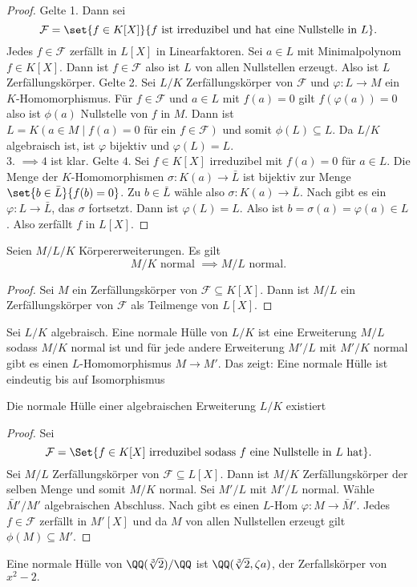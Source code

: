 \begin{proof}
    Gelte 1. Dann sei \[\mathcal F=\set{f\in K[X]}{ f\text{ ist irreduzibel und hat eine Nullstelle in \(L\)}}.\]
    Jedes \(f\in \mathcal F\) zerfällt in \(L[X]\) in Linearfaktoren.
    Sei \(a\in L\) mit Minimalpolynom \(f\in K[X]\). Dann ist \(f\in\mathcal F\) also ist \(L\) von allen Nullstellen erzeugt. Also ist \(L\) Zerfällungskörper.
    Gelte 2. Sei \(L/K\) Zerfällungskörper von \(\mathcal F\) und \(\varphi\colon L\to M\) ein \(K\)-Homomorphismus. Für \(f\in \mathcal F\) und \(a\in L\) mit \(f(a)=0\) gilt \(f(\varphi(a))=0\) also ist \(\phi(a)\) Nullstelle von \(f\) in \(M\).
    Dann ist \(L=K(a\in M\mid f(a)=0 \text{ für ein } f\in\mathcal F)\) und somit \(\phi(L)\subseteq L\). Da \(L/K\) algebraisch ist, ist \(\varphi\) bijektiv und \(\varphi(L)=L.\)\\
    3. \(\implies 4\) ist klar. Gelte \(4.\) Sei \(f\in K[X]\) irreduzibel mit \(f(a)=0\) für \(a\in L\).
    Die Menge der \(K\)-Homomorphismen \(\sigma\colon K(a)\to \bar L\) ist bijektiv zur Menge \(\set{b\in\bar L}{ f(b)=0}\). Zu \(b\in \bar L\) wähle also \(\sigma\colon K(a)\to \bar L\).
    Nach  gibt es ein \(\varphi\colon L\to \bar L\), das \(\sigma\) fortsetzt. Dann ist \(\varphi(L)=L\). Also ist \(b=\sigma(a)=\varphi(a)\in L\). Also zerfällt \(f\) in \(L[X]\).
\end{proof}
\begin{Lemma}
    Seien \(M/L/K\) Körpererweiterungen. Es gilt \[M/K \text{ normal }\implies M/L \text{ normal.}\]
\end{Lemma}
\begin{proof}
    Sei \(M\) ein Zerfällungskörper von \(\mathcal{F}\subseteq K[X]\). Dann ist \(M/L\) ein Zerfällungskörper von \(\mathcal F\) als Teilmenge von \(L[X].\)
\end{proof}
\begin{Def}
    Sei \(L/K\) algebraisch. Eine normale Hülle von \(L/K\) ist eine Erweiterung \(M/L\) sodass \(M/K\) normal ist und für jede andere Erweiterung \(M'/L\) mit \(M'/K\) normal gibt es einen \(L\)-Homomorphismus \(M\to M'\). Das zeigt: Eine normale Hülle ist eindeutig bis auf Isomorphismus
\end{Def}
\begin{Satz}
    Die normale Hülle einer algebraischen Erweiterung \(L/K\) existiert
\end{Satz}
\begin{proof}
    Sei \[\mathcal F=\Set{f\in K[X] \text{ irreduzibel sodass \(f\) eine Nullstelle in \(L\) hat}}.\] Sei \(M/L\) Zerfällungskörper von \(\mathcal F\subseteq L[X]\). Dann ist \(M/K\) Zerfällungskörper der selben Menge und somit \(M/K\) normal. Sei \(M'/L\) mit \(M'/L\) normal. Wähle \(\bar M'/M'\) algebraischen Abschluss. Nach  gibt es einen \(L\)-Hom \(\varphi\colon M\to\bar M'\). Jedes \(f\in\mathcal F\) zerfällt in \(M'[X]\) und da \(M\) von allen Nullstellen erzeugt gilt \(\phi(M)\subseteq M'\).
\end{proof}
\begin{Bsp}
    Eine normale Hülle von \(\QQ(\sqrt[3]{2})/\QQ\) ist \(\QQ(\sqrt[3]{2},\zeta a)\), der Zerfallskörper von \(x^2-2.\)
\end{Bsp}
